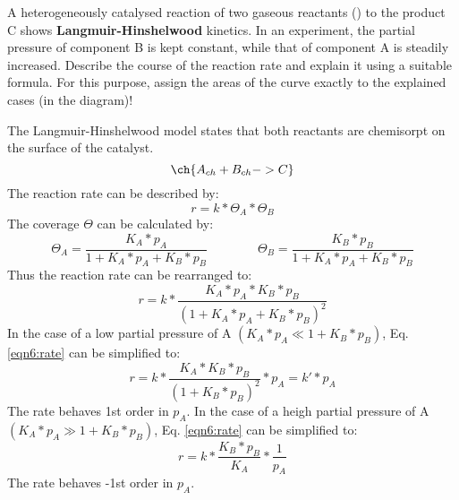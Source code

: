 \begin{question}
A heterogeneously catalysed reaction of two gaseous reactants () to the product C shows \textbf{Langmuir-Hinshelwood} kinetics. In an experiment, the partial pressure of component B is kept constant, while that of component A is steadily increased. Describe the course of the reaction rate and explain it using a suitable formula.  For this purpose, assign the areas of the curve exactly to the explained cases (in the diagram)! 

\end{question}
\begin{solution}
The Langmuir-Hinshelwood model states that both reactants are chemisorpt on the surface of the catalyst.
\begin{equation*}
\ch{A_{ch} + B_{ch} -> C}
\end{equation*}
The reaction rate can be described by:
\begin{equation}
r = k * \Theta_A * \Theta_B
\end{equation}
The coverage $\Theta$ can be calculated by:
\begin{equation}
\Theta_A = \frac{K_A * p_A}{1 + K_A * p_A + K_B * p_B} \qquad\qquad \Theta_B = \frac{K_B * p_B}{1 + K_A * p_A + K_B * p_B} 
\end{equation}
Thus the reaction rate can be rearranged to:
\begin{equation}\label{eqn6:rate}
r = k * \frac{K_A * p_A * K_B * p_B}{(1 + K_A * p_A + K_B * p_B)^2}
\end{equation}
In the case of a low partial pressure of A $(K_A * p_A \ll 1 + K_B * p_B)$, Eq. \ref{eqn6:rate} can be simplified to:
\begin{equation}
r = k *\frac{K_A * K_B * p_B}{(1 + K_B * p_B)^2}*p_A = k' * p_A 
\end{equation}
The rate behaves 1st order in $p_A$. In the case of a heigh partial pressure of A $(K_A * p_A \gg 1 + K_B * p_B)$, Eq. \ref{eqn6:rate} can be simplified to:
\begin{equation}
r = k * \frac{K_B * p_B}{K_A} * \frac{1}{p_A}
\end{equation}
The rate behaves -1st order in $p_A$.
\begin{center}

\end{center}
\end{solution}
